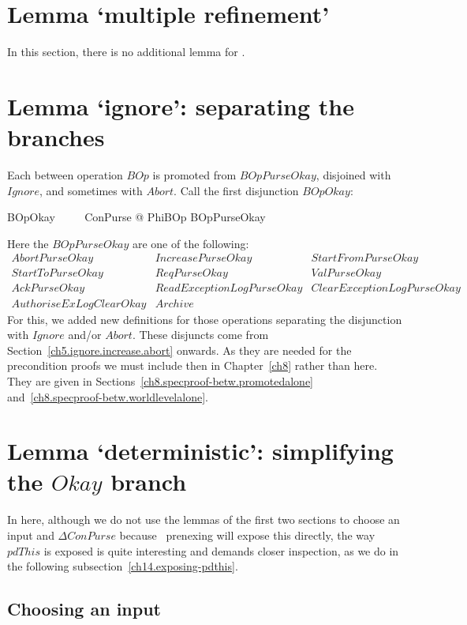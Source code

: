\section{Lemma `multiple refinement'}\label{ch14.between-sep}

In this section, there is no additional lemma for \zeves.

\section{Lemma `ignore': separating the branches}\label{ch14.between-special}

Each between operation $BOp$ is promoted from $BOpPurseOkay$,
disjoined with $Ignore$, and sometimes with $Abort$.  Call the first
disjunction $BOpOkay$:
%
\begin{gzed}
  BOpOkay ~~~~ \exists \Delta ConPurse  @ PhiBOp \land BOpPurseOkay
\end{gzed}
%
Here the $BOpPurseOkay$ are one of the following:
\[
\begin{array}{lll}
    AbortPurseOkay    & IncreasePurseOkay & StartFromPurseOkay \\
    StartToPurseOkay  & ReqPurseOkay      & ValPurseOkay \\
    AckPurseOkay      & ReadExceptionLogPurseOkay & ClearExceptionLogPurseOkay\\
    AuthoriseExLogClearOkay &Archive
\end{array}
\]
%
For this, we added new definitions for those operations separating
the disjunction with $Ignore$ and/or $Abort$. These disjuncts come
from Section~\ref{ch5.ignore.increase.abort} onwards. As they are
needed for the precondition proofs we must include then in
Chapter~\ref{ch8} rather than here. They are given in
Sections~\ref{ch8.specproof-betw.promotedalone}
and~\ref{ch8.specproof-betw.worldlevelalone}.

\section{Lemma `deterministic': simplifying the $Okay$ branch}\label{ch14.general-bop-okay}

In here, although we do not use the lemmas of the first two sections
to choose an input and $\Delta ConPurse$ because \zeves\ prenexing
will expose this directly, the way $pdThis$ is exposed is quite
interesting and demands closer inspection, as we do in the following
subsection~\ref{ch14.exposing-pdthis}.

\subsection{Choosing an input}

